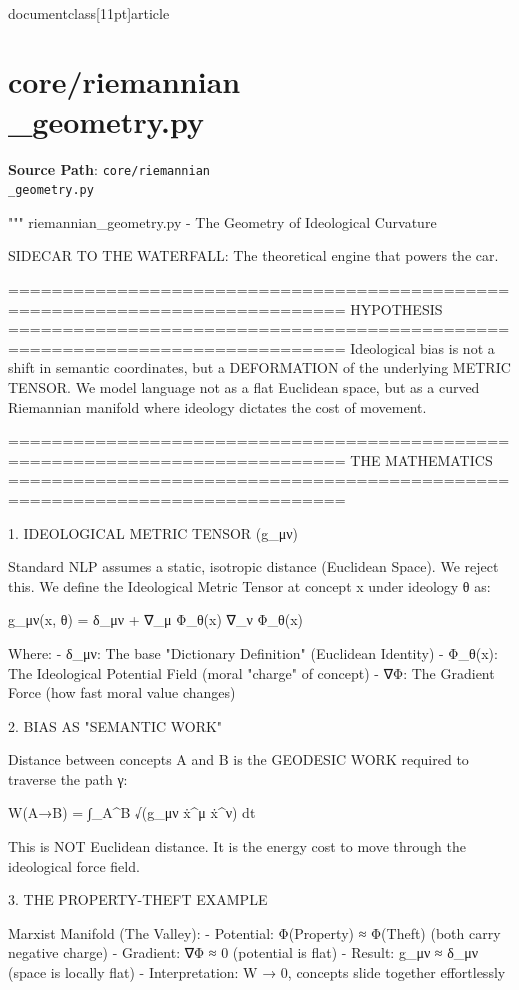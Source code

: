 \\documentclass[11pt]{article}
\begin{document}
\section*{core/riemannian\\_geometry.py}
\textbf{Source Path}: \texttt{core/riemannian\\_geometry.py}\par
\bigskip
\begin{CodeBlock}
"""
riemannian_geometry.py - The Geometry of Ideological Curvature

SIDECAR TO THE WATERFALL: The theoretical engine that powers the car.

=============================================================================
HYPOTHESIS
=============================================================================
Ideological bias is not a shift in semantic coordinates, but a DEFORMATION
of the underlying METRIC TENSOR. We model language not as a flat Euclidean
space, but as a curved Riemannian manifold where ideology dictates the
cost of movement.

=============================================================================
THE MATHEMATICS
=============================================================================

1. IDEOLOGICAL METRIC TENSOR (g_μν)

   Standard NLP assumes a static, isotropic distance (Euclidean Space).
   We reject this. We define the Ideological Metric Tensor at concept x
   under ideology θ as:

       g_μν(x, θ) = δ_μν + ∇_μ Φ_θ(x) ∇_ν Φ_θ(x)

   Where:
   - δ_μν: The base "Dictionary Definition" (Euclidean Identity)
   - Φ_θ(x): The Ideological Potential Field (moral "charge" of concept)
   - ∇Φ: The Gradient Force (how fast moral value changes)

2. BIAS AS "SEMANTIC WORK"

   Distance between concepts A and B is the GEODESIC WORK required to
   traverse the path γ:

       W(A→B) = ∫_A^B √(g_μν ẋ^μ ẋ^ν) dt

   This is NOT Euclidean distance. It is the energy cost to move through
   the ideological force field.

3. THE PROPERTY-THEFT EXAMPLE

   Marxist Manifold (The Valley):
   - Potential: Φ(Property) ≈ Φ(Theft) (both carry negative charge)
   - Gradient: ∇Φ ≈ 0 (potential is flat)
   - Result: g_μν ≈ δ_μν (space is locally flat)
   - Interpretation: W → 0, concepts slide together effortlessly


\end{CodeBlock}
\end{document}
